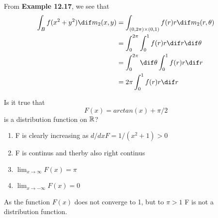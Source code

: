 \begin{solution}
From \textbf{Example 12.17}, we see that
\begin{align*}
\int_B f(x^2+y^2)\dif m_2(x,y) & = \int_{(0,2\pi)\times(0,1)}f(r)r \dif m_2(r,\theta) \\
 & = \int_0^{2\pi}\int_0^1 f(r)r \dif r \dif \theta \\
 & = \int_0^{2\pi} \dif \theta \int_0^1 f(r)r \dif r \\
 & = 2\pi\int_0^1 f(r)r \dif r \\
\end{align*}
\end{solution}
\begin{problem}
Is it true that
\[
	F(x)=arctan(x)+\pi/2
\]
is a distribution function on \({\mathbb{R}}\)?
\end{problem}
\begin{solution}
\begin{enumerate}
	\item F is clearly increasing as \(d/dx F = 1/(x^2+1) >0\)
	\item F is continus and therby also right continus
	\item \(\lim_{x \rightarrow \infty}F(x)=\pi\)
	\item \(\lim_{x \rightarrow -\infty}F(x)=0\)
\end{enumerate}
As the function \(F(x)\) does not converge to 1, but to \(\pi>1\) F is not a distribution function.
\end{solution}
